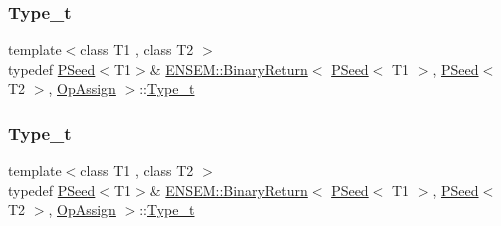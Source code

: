 \subsubsection{\texorpdfstring{Type\_t}{Type\_t}\hspace{0.1cm}{\footnotesize\ttfamily [1/3]}}
{\footnotesize\ttfamily template$<$class T1 , class T2 $>$ \\
typedef \mbox{\hyperlink{classENSEM_1_1PSeed}{P\+Seed}}$<$T1$>$\& \mbox{\hyperlink{structENSEM_1_1BinaryReturn}{E\+N\+S\+E\+M\+::\+Binary\+Return}}$<$ \mbox{\hyperlink{classENSEM_1_1PSeed}{P\+Seed}}$<$ T1 $>$, \mbox{\hyperlink{classENSEM_1_1PSeed}{P\+Seed}}$<$ T2 $>$, \mbox{\hyperlink{structENSEM_1_1OpAssign}{Op\+Assign}} $>$\+::\mbox{\hyperlink{structENSEM_1_1BinaryReturn_3_01PSeed_3_01T1_01_4_00_01PSeed_3_01T2_01_4_00_01OpAssign_01_4_a14ba5023d53a2620dfd0bbb617d040c6}{Type\+\_\+t}}}

\mbox{\label{structENSEM_1_1BinaryReturn_3_01PSeed_3_01T1_01_4_00_01PSeed_3_01T2_01_4_00_01OpAssign_01_4_a14ba5023d53a2620dfd0bbb617d040c6}} 
\subsubsection{\texorpdfstring{Type\_t}{Type\_t}\hspace{0.1cm}{\footnotesize\ttfamily [2/3]}}
{\footnotesize\ttfamily template$<$class T1 , class T2 $>$ \\
typedef \mbox{\hyperlink{classENSEM_1_1PSeed}{P\+Seed}}$<$T1$>$\& \mbox{\hyperlink{structENSEM_1_1BinaryReturn}{E\+N\+S\+E\+M\+::\+Binary\+Return}}$<$ \mbox{\hyperlink{classENSEM_1_1PSeed}{P\+Seed}}$<$ T1 $>$, \mbox{\hyperlink{classENSEM_1_1PSeed}{P\+Seed}}$<$ T2 $>$, \mbox{\hyperlink{structENSEM_1_1OpAssign}{Op\+Assign}} $>$\+::\mbox{\hyperlink{structENSEM_1_1BinaryReturn_3_01PSeed_3_01T1_01_4_00_01PSeed_3_01T2_01_4_00_01OpAssign_01_4_a14ba5023d53a2620dfd0bbb617d040c6}{Type\+\_\+t}}}

\mbox{\label{structENSEM_1_1BinaryReturn_3_01PSeed_3_01T1_01_4_00_01PSeed_3_01T2_01_4_00_01OpAssign_01_4_a14ba5023d53a2620dfd0bbb617d040c6}} 
